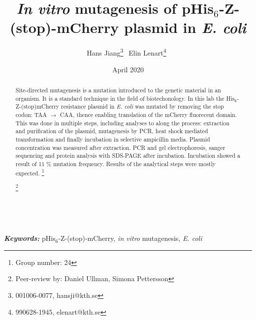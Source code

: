 \documentclass[11pt,a4paper]{article}
\title{\textit{In vitro} mutagenesis of pHis$_6$-Z-(stop)-mCherry plasmid in \textit{E. coli}}
\author{Hans Jiang\thanks{001006-0077, hansji@kth.se} $\: \:$Elin Lenart\thanks{990628-1945, elenart@kth.se}$\: \:$}
\date{April 2020}
\providecommand{\keywords}[1]{\textbf{\textit{Keywords:}} #1}
\newcommand\blfootnote[1]{%
  \begingroup
  \renewcommand\thefootnote{}\footnote{#1}%
  \addtocounter{footnote}{-1}%
  \endgroup
}
\begin{document}
\maketitle
{}

\begin{abstract}
Site-directed mutagenesis is a mutation introduced to the genetic material in an organism. It is a standard technique in the field of biotechonology. In this lab the His$_6$-Z-(stop)mCherry resistance plasmid in \textit{E. coli} was mutated by removing the stop codon: TAA $\rightarrow$ CAA, thence enabling translation of the mCherry fluorecent domain. This was done in multiple steps, including analyses to along the process: extraction and purification of the plasmid, mutagenesis by PCR, heat shock mediated transformation and finally incubation in selective ampicillin media. Plasmid concentration was measured after extraction. PCR and gel electrophoresis, sanger sequencing and protein analysis with SDS-PAGE after incubation. Incubation showed a result of 11 \% mutation frequency. Results of the analytical steps were mostly expected. \blfootnote{Group number: 24} \blfootnote{Peer-review by: Daniel Ullman, Simona Pettersson} \\

\end{abstract}
\keywords{pHis$_6$-Z-(stop)-mCherry, \textit{in vitro} mutagenesis, \textit{E. coli}}
\pagebreak
\tableofcontents \pagebreak
\end{document}
